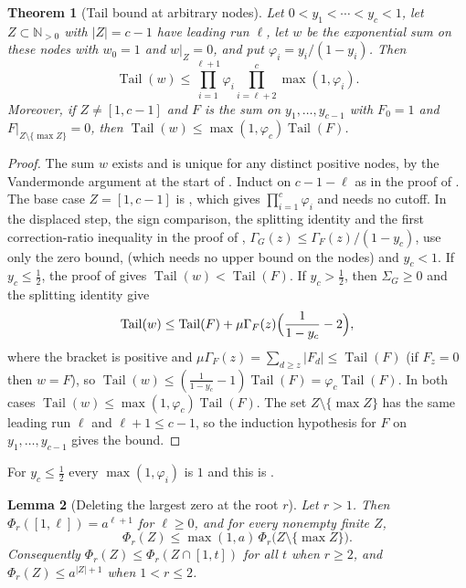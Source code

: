 \documentclass[11pt]{article}
\newtheorem{theorem}{Theorem}[section]
\newtheorem{lemma}[theorem]{Lemma}
\newcommand{\N}{\mathbb N}
\DeclareMathOperator{\Tail}{Tail}
\begin{document}
\begin{theorem}[Tail bound at arbitrary nodes]\label{thm:tailgen}
Let $0<y_1<\cdots<y_c<1$, let $Z\subset\N_{>0}$ with $|Z|=c-1$ have leading
run $\ell$, let $w$ be the exponential sum on these nodes with $w_0=1$ and
$w|_Z=0$, and put $\varphi_i=y_i/(1-y_i)$.  Then
\[
  \Tail(w)\le\prod_{i=1}^{\ell+1}\varphi_i\prod_{i=\ell+2}^c\max(1,\varphi_i).
\]
Moreover, if $Z\ne[1,c-1]$ and $F$ is the sum on $y_1,\ldots,y_{c-1}$ with
$F_0=1$ and $F|_{Z\setminus\{\max Z\}}=0$, then
$\Tail(w)\le\max(1,\varphi_c)\Tail(F)$.
\end{theorem}

\begin{proof}
The sum $w$ exists and is unique for any distinct positive nodes, by the
Vandermonde argument at the start of \cite[Section~2]{coefficient-mass}.  Induct on $c-1-\ell$ as in
the proof of \cite[Theorem~2.2]{coefficient-mass}.  The base case $Z=[1,c-1]$ is
\cite[Lemma~2.1]{coefficient-mass}, which gives $\prod_{i=1}^c\varphi_i$ and needs
no cutoff.  In the displaced step, the sign comparison, the splitting
identity and the first correction-ratio inequality in the proof of
\cite[Theorem~2.2]{coefficient-mass},
$\Gamma_G(z)\le\Gamma_F(z)/(1-y_c)$, use only the zero bound,
\cite[Lemma~2.3]{coefficient-mass} (which needs no upper bound on the nodes) and
$y_c<1$.  If $y_c\le\frac12$, the proof of \cite[Theorem~2.2]{coefficient-mass} gives
$\Tail(w)<\Tail(F)$.  If $y_c>\frac12$, then $\Sigma_G\ge0$ and
the splitting identity give
\[
  \Tail(w)\le\Tail(F)+\mu\Gamma_F(z)\Bigl(\frac1{1-y_c}-2\Bigr),
\]
where the bracket is positive and
$\mu\Gamma_F(z)=\sum_{d\ge z}|F_d|\le\Tail(F)$ (if $F_z=0$ then $w=F$), so
$\Tail(w)\le(\frac1{1-y_c}-1)\Tail(F)=\varphi_c\Tail(F)$.  In both cases
$\Tail(w)\le\max(1,\varphi_c)\Tail(F)$.  The set $Z\setminus\{\max Z\}$ has
the same leading run $\ell$ and $\ell+1\le c-1$, so the induction hypothesis
for $F$ on $y_1,\ldots,y_{c-1}$ gives the bound.
\end{proof}

For $y_c\le\frac12$ every $\max(1,\varphi_i)$ is $1$ and this is
\cite[Theorem~2.2]{coefficient-mass}.

\begin{lemma}[Deleting the largest zero at the root $r$]\label{lem:confdelr}
Let $r>1$.  Then $\Phi_r([1,\ell])=a^{\ell+1}$ for $\ell\ge0$, and for every
nonempty finite $Z$,
\[
  \Phi_r(Z)\le\max(1,a)\,\Phi_r\bigl(Z\setminus\{\max Z\}\bigr).
\]
Consequently $\Phi_r(Z)\le\Phi_r(Z\cap[1,t])$ for all $t$ when $r\ge2$, and
$\Phi_r(Z)\le a^{|Z|+1}$ when $1<r\le2$.
\end{lemma}
\end{document}
